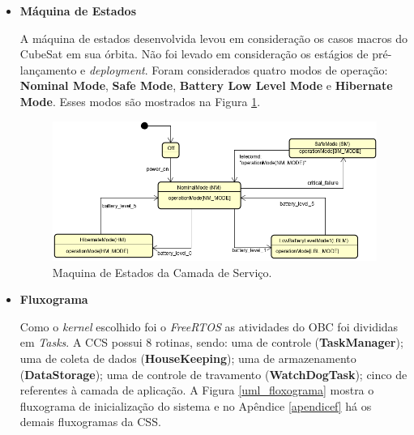 \begin{itemize}
	
	\item \textbf{Máquina de Estados}
	
	A máquina de estados desenvolvida levou em consideração os casos macros do CubeSat em sua órbita. Não foi levado em consideração os estágios de pré-lançamento e \textit{deployment}. Foram considerados quatro modos de operação: \textbf{Nominal Mode}, \textbf{Safe Mode}, \textbf{Battery Low Level Mode} e \textbf{Hibernate Mode}. Esses modos são mostrados na Figura \ref{uml_me}.
	
	\begin{figure}[h]
		\centering
		
		
		\includegraphics[keepaspectratio=true,scale=0.62]{figuras/stateMachine.png}
		\caption{Maquina de Estados da Camada de Serviço.}
		\label{uml_me}
	\end{figure}
	\FloatBarrier
	\item \textbf{Fluxograma}
	
	Como o \textit{kernel} escolhido foi o \textit{FreeRTOS} as atividades do OBC foi divididas em \textit{Tasks}. A CCS possui 8 rotinas, sendo: uma de controle (\textbf{TaskManager}); uma de coleta de dados (\textbf{HouseKeeping}); uma de armazenamento (\textbf{DataStorage}); uma de controle de travamento (\textbf{WatchDogTask}); cinco de referentes à camada de aplicação. A Figura \ref{uml_floxograma} mostra o fluxograma de inicialização do sistema e no Apêndice \ref{apendicef} há os demais fluxogramas da CSS. 
	
	\begin{figure}[h]
		\centering
		

\end{figure}
\end{itemize}
